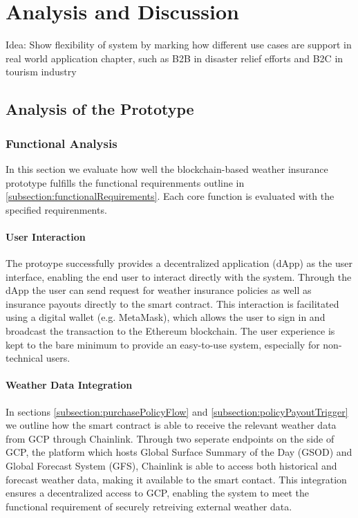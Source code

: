 \chapter{Analysis and Discussion}\label{chapter:analysis_discussion}
Idea: Show flexibility of system by marking how different use cases are support in real world application chapter, such as B2B in disaster relief efforts and B2C in tourism industry

\section{Analysis of the Prototype}


\subsection{Functional Analysis}

In this section we evaluate how well the blockchain-based weather insurance prototype fulfills the functional requirenments outline in \cref{subsection:functionalRequirements}. Each core function is evaluated with the specified requirenments.

\subsubsection{User Interaction}

The protoype successfully provides a decentralized application (dApp) as the user interface, enabling the end user to interact directly with the system. Through the dApp the user can send request for weather insurance policies as well as insurance payouts directly to the smart contract. This interaction is facilitated using a digital wallet (e.g. MetaMask), which allows the user to sign in and broadcast the transaction to the Ethereum blockchain. The user experience is kept to the bare minimum to provide an easy-to-use system, especially for non-technical users. 

\subsubsection{Weather Data Integration}

In sections \cref{subsection:purchasePolicyFlow} and \cref{subsection:policyPayoutTrigger} we outline how the smart contract is able to receive the relevant weather data from GCP through Chainlink. Through two seperate endpoints on the side of GCP, the platform which hosts Global Surface Summary of the Day (GSOD) and Global Forecast System (GFS), Chainlink is able to access both historical and forecast weather data, making it available to the smart contact. This integration ensures a decentralized access to GCP, enabling the system to meet the functional requirement of securely retreiving external weather data.

